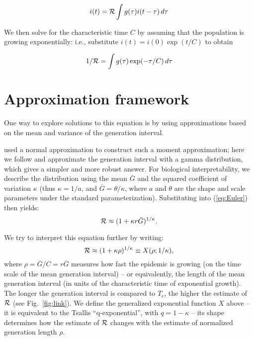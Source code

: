 \documentclass[12pt,]{article}
\newcommand{\RR}{\ensuremath{{\cal R}}}
\newcommand{\Tc}{\ensuremath{C}}
\newcommand{\eref}[1]{(\ref{eq:#1})}
\newcommand{\fref}[1]{Fig.~\ref{fig:#1}}
\begin{document}
$$i(t) = \RR\int{g(\tau)i(t-\tau) \,d\tau}$$

We then solve for the characteristic time $\Tc$ by assuming that the population is growing exponentially: i.e., substitute $i(t) = i(0) \exp(t/\Tc)$ to obtain

\begin{equation}
	1/\RR = \int{g(\tau)\exp(-\tau/\Tc) \,d\tau}\label{eq:Euler}
\end{equation}

\section{Approximation framework}

One way to explore solutions to this equation is by using approximations based on the mean and variance of the generation interval.

\cite{WallLips07} used a normal approximation to construct such a moment approximation; here we follow \cite{NishCast09} and approximate the generation interval with a gamma distribution, which gives a simpler and more robust answer.
For biological interpretability, we describe the distribution using the mean $\bar G$ and the squared coefficient of variation $\kappa$ (thus $\kappa = 1/a$, and $\bar G = \theta/\kappa$, where $a$ and $\theta$ are the shape and scale parameters under the standard parameterization).
Substituting into \eref{Euler} then yields:
\begin{equation}
	\RR \approx (1 + \kappa r \bar G)^{1/\kappa}.
	\label{eq:genExp}
\end{equation}

We try to interpret this equation further by writing:
\begin{equation}
	\RR \approx (1 + \kappa \rho)^{1/\kappa} \equiv X(\rho; 1/\kappa),
	\label{eq:genExp}
\end{equation}
where $\rho = \bar G/\Tc = r\bar G$ measures how fast the epidemic is growing (on the time scale of the mean generation interval) -- or equivalently, the length of the mean generation interval (in units of the characteristic time of exponential growth).
The longer the generation interval is compared to $T_c$, the higher the estimate of $\RR$ (see \fref{link}).
We define the generalized exponential function $X$ above -- it is equivalent to the Tsallis ``q-exponential'', with $q=1-\kappa$ \cite{tsallis1994numbers} -- its shape determines how the estimate of $\RR$ changes with the estimate of normalized generation length $\rho$.
\end{document}
